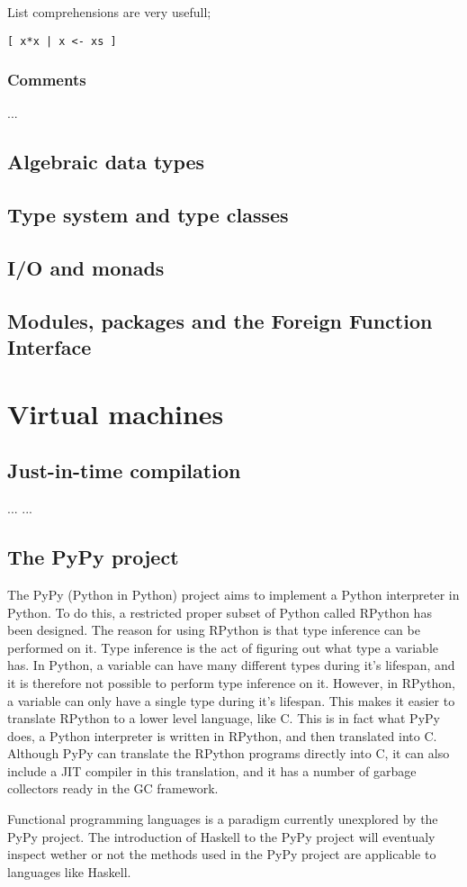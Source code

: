 List comprehensions are very usefull;

\begin{lstlisting}
[ x*x | x <- xs ]
\end{lstlisting}

\subsubsection{Comments}

...

\subsection{Algebraic data types}

\subsection{Type system and type classes}

\subsection{I/O and monads}

\subsection{Modules, packages and the Foreign Function Interface}







\section{Virtual machines}

\subsection{Just-in-time compilation}

... ...

\subsection{The PyPy project}

The PyPy (Python in Python) project aims to implement a Python interpreter in Python.
To do this, a restricted proper subset of Python called RPython has been designed.
The reason for using RPython is that type inference can be performed on it. Type
inference is the act of figuring out what type a variable has. In Python, a variable
can have many different types during it's lifespan, and it is therefore not possible
to perform type inference on it. However, in RPython, a variable can only have a 
single type during it's lifespan. This makes it easier to translate RPython to a lower
level language, like C. This is in fact what PyPy does, a Python interpreter is written
in RPython, and then translated into C. Although PyPy can translate the RPython programs
directly into C, it can also include a JIT compiler in this translation, and it has
a number of garbage collectors ready in the GC framework.



Functional programming languages is a paradigm currently
unexplored by the PyPy project. The introduction of Haskell
to the PyPy project will eventualy inspect wether or not 
the methods used in the PyPy project are applicable to languages
like Haskell.


